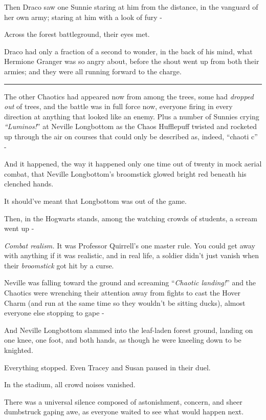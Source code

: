 Then Draco saw one Sunnie staring at him from the distance, in the vanguard of her own army; staring at him with a look of fury -

Across the forest battleground, their eyes met.

Draco had only a fraction of a second to wonder, in the back of his mind, what Hermione Granger was so angry about, before the shout went up from both their armies; and they were all running forward to the charge.

\begin{center}\rule{3in}{0.4pt}\end{center}

The other Chaotics had appeared now from among the trees, some had \emph{dropped out} of trees, and the battle was in full force now, everyone firing in every direction at anything that looked like an enemy. Plus a number of Sunnies crying \emph{``Luminos!}'' at Neville Longbottom as the Chaos Hufflepuff twisted and rocketed up through the air on courses that could only be described as, indeed, ``chaoti c'' -

And it happened, the way it happened only one time out of twenty in mock aerial combat, that Neville Longbottom's broomstick glowed bright red beneath his clenched hands.

It should've meant that Longbottom was out of the game.

Then, in the Hogwarts stands, among the watching crowds of students, a scream went up -

\emph{Combat realism.} It was Professor Quirrell's one master rule. You could get away with anything if it was realistic, and in real life, a soldier didn't just vanish when their \emph{broomstick} got hit by a curse.

Neville was falling toward the ground and screaming ``\emph{Chaotic landing!}'' and the Chaotics were wrenching their attention away from fights to cast the Hover Charm (and run at the same time so they wouldn't be sitting ducks), almost everyone else stopping to gape -

And Neville Longbottom slammed into the leaf-laden forest ground, landing on one knee, one foot, and both hands, as though he were kneeling down to be knighted.

Everything stopped. Even Tracey and Susan paused in their duel.

In the stadium, all crowd noises vanished.

There was a universal silence composed of astonishment, concern, and sheer dumbstruck gaping awe, as everyone waited to see what would happen next.

